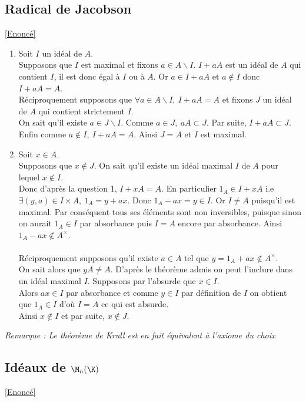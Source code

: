 \documentclass[8pt]{book}
\begin{document}
	\subsection{Radical de Jacobson }
	\label{Radical de Jacobson corrigé}
	\textcolor{blue}{\hyperref[Radical de Jacobson]{[Enoncé]}}\\
	\begin{enumerate}[leftmargin=*]
		\item Soit $I$ un idéal de $A$.\\
		Supposons que $I$ est maximal et fixons $a\in A\backslash I$. $I+aA$ est un idéal de $A$ qui contient $I$, il est donc égal à $I$ ou à $A$. Or $a\in I+aA$ et $a\notin I$ donc $I+aA=A$.\\
		Réciproquement supposons que $\forall a\in A\backslash I,\ I+aA=A$ et fixons $J$ un idéal de $A$ qui contient strictement $I$.\\
		On sait qu'il existe $a\in J\backslash I$. Comme $a\in J,\ aA\subset J$. Par suite, $I+aA\subset J$. Enfin comme $a\notin I,\ I+aA=A$. Ainsi $J=A$ et $I$ est maximal.
		\item Soit $x\in A$.\\
		Supposons que $x\notin J$. On sait qu'il existe un idéal maximal $I$ de $A$ pour lequel $x\notin I$.\\
		Donc d'après la question 1, $I+xA=A$. En particulier $1_A\in I+xA$ i.e $\exists (y,a)\in I\times A,\ 1_A=y+ax$. Donc $1_A-ax=y\in I$. Or $I\ne A$ puisqu'il est maximal. Par conséquent tous ses éléments sont non inversibles, puisque sinon on aurait $1_A\in I$ par absorbance puis $I=A$ encore par absorbance. Ainsi $1_A-ax\notin A^\times$.\\\\
		Réciproquement supposons qu'il existe $a\in A$ tel que $y=1_A+ax\notin A^\times$.\\
		On sait alors que $yA\ne A$. D'après le théorème admis on peut l'inclure dans un idéal maximal $I$. Supposons par l'absurde que $x\in I$.\\
		Alors $ax\in I$ par absorbance et comme $y\in I$ par définition de $I$ on obtient que $1_A\in I$ d'où $I=A$ ce qui est absurde.\\
		Ainsi $x\notin I$ et par suite, $x\notin J$.
	\end{enumerate}
	\textit{Remarque : Le théorème de Krull est en fait équivalent à l'axiome du choix}
	
	\subsection{Idéaux de $\M_n(\K)$}
	\label{Idéaux de Mn(K) corrigé}
	\textcolor{blue}{\hyperref[Idéaux de Mn(K)]{[Enoncé]}}\\
	
\end{document}
